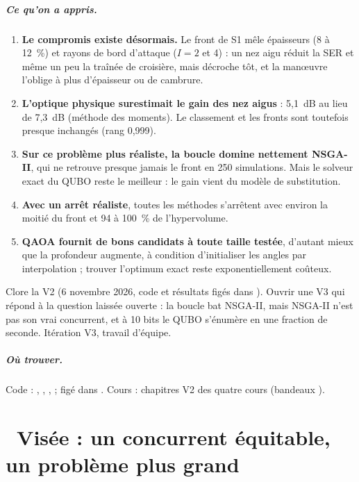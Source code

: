 \documentclass[11pt,a4paper]{report}
\newcommand{\iterchapter}[2]{\chapter{\texorpdfstring{\protect\iterbadge{#1}\ }{#1 : }#2}\iterbanner{#1}}
\begin{document}
\paragraph{Ce qu'on a appris.}
\begin{enumerate}
\item \textbf{Le compromis existe désormais.} Le front de S1 mêle épaisseurs (8 à 12~\%) et rayons de bord d'attaque ($I=2$ et 4) : un nez aigu réduit la SER et même un peu la traînée de croisière, mais décroche tôt, et la manœuvre l'oblige à plus d'épaisseur ou de cambrure.
\item \textbf{L'optique physique surestimait le gain des nez aigus} : 5,1~dB au lieu de 7,3~dB (méthode des moments). Le classement et les fronts sont toutefois presque inchangés (rang 0,999).
\item \textbf{Sur ce problème plus réaliste, la boucle domine nettement NSGA-II}, qui ne retrouve presque jamais le front en 250 simulations. Mais le solveur exact du QUBO reste le meilleur : le gain vient du modèle de substitution.
\item \textbf{Avec un arrêt réaliste}, toutes les méthodes s'arrêtent avec environ la moitié du front et 94 à 100~\% de l'hypervolume.
\item \textbf{QAOA fournit de bons candidats à toute taille testée}, d'autant mieux que la profondeur augmente, à condition d'initialiser les angles par interpolation ; trouver l'optimum exact reste exponentiellement coûteux.
\end{enumerate}

\begin{decision}
Clore la V2 (6 novembre 2026, code et résultats figés dans ). Ouvrir une V3 qui répond à la question laissée ouverte : la boucle bat NSGA-II, mais NSGA-II n'est pas son vrai concurrent, et à 10 bits le QUBO s'énumère en une fraction de seconde. Itération V3, travail d'équipe.
\end{decision}

\paragraph{Où trouver.} Code : , , ,  ; figé dans . Cours : chapitres V2 des quatre cours (bandeaux ).

\iterchapter{V3}{Visée : un concurrent équitable, un problème plus grand}\label{ch:v3}
\end{document}
